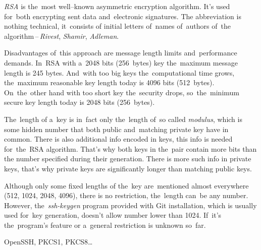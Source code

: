 \textit{RSA} is the~most well--known asymmetric encryption algorithm. It's used for~both encrypting sent data and~electronic signatures. The abbreviation is nothing technical, it~consists of initial letters of~names of~authors of~the algorithm\,--\,\textit{Rivest}, \textit{Shamir}, \textit{Adleman}.

Disadvantages of~this approach are message length limits and~performance demands. In~RSA with a~2048 bits (256~bytes) key the~maximum message length is 245 bytes. And~with too big keys the~computational time grows, the~maximum reasonable key length today is 4096 bits (512~bytes). On~the~other hand with too short key the~security drops, so~the~minimum secure key length today is 2048 bits (256~bytes).

The~length of a~key is in~fact only the~length of~so called \textit{modulus}, which is some hidden number that both public and~matching private key have in common. There is also additional info encoded in keys, this info is needed for~the~RSA algorithm. That's why both keys in the~pair contain more bits than the number specified during their generation. There is more such info in private keys, that's why private keys are significantly longer than matching public keys.

\warning Although only some fixed lengths of the~key are~mentioned almost everywhere (512, 1024, 2048, 4096), there is no restriction, the~length can~be any number. However, the~\textit{ssh-keygen} program provided with Git installation, which is usually used for~key generation, doesn't allow number lower than 1024. If~it's the~program's feature or a~general restriction is unknown so~far.

\newline\todo OpenSSH, PKCS1, PKCS8\dots

\label{electronicsignature}


\label{gpg}

